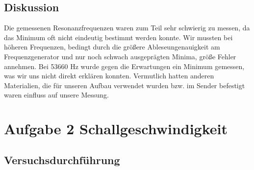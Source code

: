\documentclass[12pt]{scrartcl}
\begin{document}
\subsection{Diskussion}
Die gemessenen Resonanzfrequenzen waren zum Teil sehr schwierig zu messen, da das Minimum oft nicht eindeutig bestimmt werden konnte.
Wir mussten bei höheren Frequenzen, bedingt durch die größere Ableseungenauigkeit am Frequenzgenerator und nur noch schwach ausgeprägten Minima, größe Fehler annehmen.
Bei 53660 Hz wurde gegen die Erwartungen ein Minimum gemessen, was wir uns nicht direkt erklären konnten. Vermutlich hatten anderen Materialien, die für unseren Aufbau verwendet wurden bzw. im Sender befestigt waren einfluss auf unsere Messung. 
\section{Aufgabe 2 Schallgeschwindigkeit}
\subsection{Versuchsdurchführung}
\end{document}
